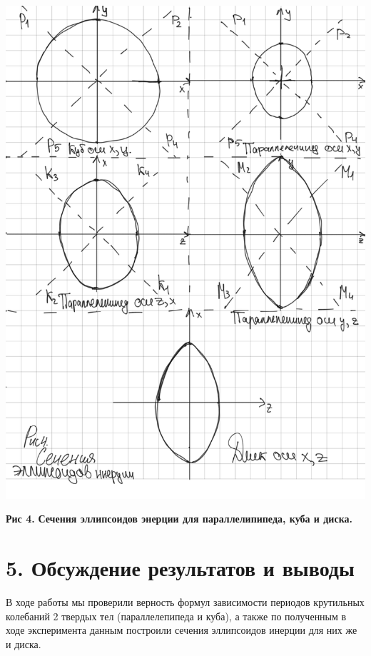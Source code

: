 \begin{center}
    \includegraphics[scale = 0.2]{ell.png}
\end{center}

\begin{flushright}
{\scriptsize \textbf{Рис 4.} \textbf {Сечения эллипсоидов энерции для параллелипипеда, куба и диска.}}
\end{flushright}
    

\section*{5. Обсуждение результатов и выводы}

    В ходе работы мы проверили верность формул зависимости периодов крутильных колебаний 2 твердых тел (параллелепипеда и куба), а также по полученным в ходе эксперимента данным построили сечения эллипсоидов инерции для них же и диска.
    



